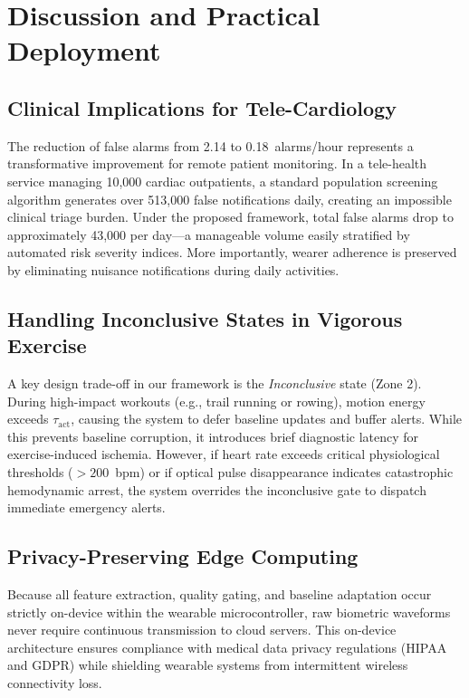 \documentclass{ieeeaccess}
\begin{document}
\section{Discussion and Practical Deployment}
\label{sec:discussion}

\subsection{Clinical Implications for Tele-Cardiology}
The reduction of false alarms from 2.14 to 0.18~alarms/hour represents a transformative improvement for remote patient monitoring. In a tele-health service managing 10,000 cardiac outpatients, a standard population screening algorithm generates over 513,000 false notifications daily, creating an impossible clinical triage burden. Under the proposed framework, total false alarms drop to approximately 43,000 per day---a manageable volume easily stratified by automated risk severity indices. More importantly, wearer adherence is preserved by eliminating nuisance notifications during daily activities.

\subsection{Handling Inconclusive States in Vigorous Exercise}
A key design trade-off in our framework is the \textit{Inconclusive} state (Zone 2). During high-impact workouts (e.g., trail running or rowing), motion energy exceeds $\tau_{\mathrm{act}}$, causing the system to defer baseline updates and buffer alerts. While this prevents baseline corruption, it introduces brief diagnostic latency for exercise-induced ischemia. However, if heart rate exceeds critical physiological thresholds ($>200$~bpm) or if optical pulse disappearance indicates catastrophic hemodynamic arrest, the system overrides the inconclusive gate to dispatch immediate emergency alerts.

\subsection{Privacy-Preserving Edge Computing}
Because all feature extraction, quality gating, and baseline adaptation occur strictly on-device within the wearable microcontroller, raw biometric waveforms never require continuous transmission to cloud servers. This on-device architecture ensures compliance with medical data privacy regulations (HIPAA and GDPR) while shielding wearable systems from intermittent wireless connectivity loss.
\end{document}
